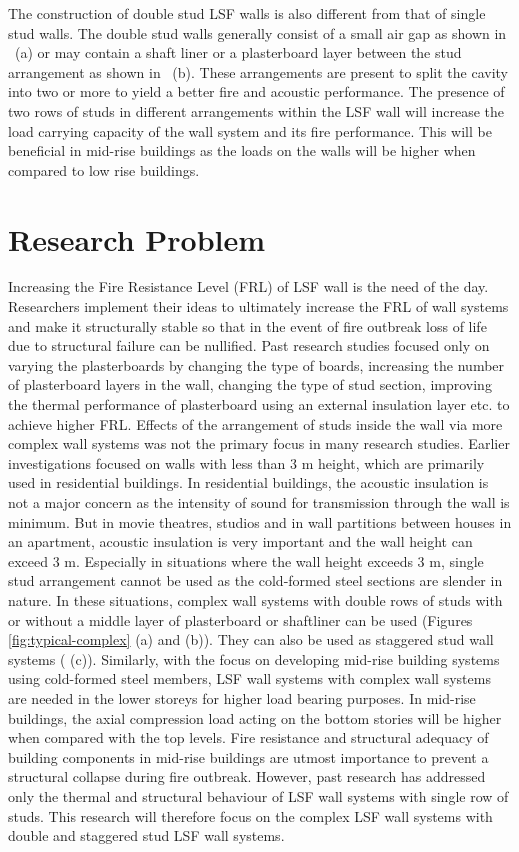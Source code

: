 The construction of double stud LSF walls is also different from that of single stud walls. The double stud walls generally consist of a small air gap as shown in ~(a) or may contain a shaft liner or a plasterboard layer between the stud arrangement as shown in ~(b). These arrangements are present to split the cavity into two or more to yield a better fire and acoustic performance. The presence of two rows of studs in different arrangements within the LSF wall will increase the load carrying capacity of the wall system and its fire performance. This will be beneficial in mid-rise buildings as the loads on the walls will be higher when compared to low rise buildings.

\section{Research Problem}

Increasing the Fire Resistance Level (FRL) of LSF wall is the need of the day. Researchers implement their ideas to ultimately increase the FRL of wall systems and make it structurally stable so that in the event of fire outbreak loss of life due to structural failure can be nullified. Past research studies focused only on varying the plasterboards by changing the type of boards, increasing the number of plasterboard layers in the wall, changing the type of stud section, improving the thermal performance of plasterboard using an external insulation layer etc. to achieve higher FRL. Effects of the arrangement of studs inside the wall via more complex wall systems was not the primary focus in many research studies. Earlier investigations focused on walls with less than 3 m height, which are primarily used in residential buildings. In residential buildings, the acoustic insulation is not a major concern as the intensity of sound for transmission through the wall is minimum. But in movie theatres, studios and in wall partitions between houses in an apartment, acoustic insulation is very important and the wall height can exceed 3 m. Especially in situations where the wall height exceeds 3 m, single stud arrangement cannot be used as the cold-formed steel sections are slender in nature. In these situations, complex wall systems with double rows of studs with or without a middle layer of plasterboard or shaftliner can be used (Figures \ref{fig:typical-complex} (a) and (b)). They can also be used as staggered stud wall systems ( (c)). Similarly, with the focus on developing mid-rise building systems using cold-formed steel members, LSF wall systems with complex wall systems are needed in the lower storeys for higher load bearing purposes. In mid-rise buildings, the axial compression load acting on the bottom stories will be higher when compared with the top levels. Fire resistance and structural adequacy of building components in mid-rise buildings are utmost importance to prevent a structural collapse during fire outbreak. However, past research has addressed only the thermal and structural behaviour of LSF wall systems with single row of studs. This research will therefore focus on the complex LSF wall systems with double and staggered stud LSF wall systems. 

